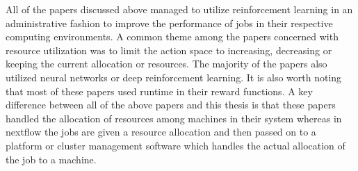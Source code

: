 All of the papers discussed above managed to utilize reinforcement learning in an administrative fashion to improve the performance of jobs in their respective computing environments. A common theme among the papers concerned with resource utilization was to limit the action space to increasing, decreasing or keeping the current allocation or resources. The majority of the papers also utilized neural networks or deep reinforcement learning. It is also worth noting that most of these papers used runtime in their reward functions. A key difference between all of the above papers and this thesis is that these papers handled the allocation of resources among machines in their system whereas in nextflow the jobs are given a resource allocation and then passed on to a platform or cluster management software which handles the actual allocation of the job to a machine. 
















































 

